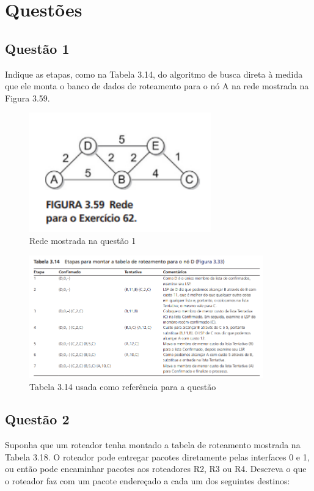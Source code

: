\section{Questões}\label{sec:questoes}


\subsection{Questão 1}
Indique as etapas, como na Tabela 3.14, do algoritmo de busca direta à medida que ele monta o
banco de dados de roteamento para o nó A na rede mostrada na Figura 3.59.

\begin{figure}[H]
    \centering
    \includegraphics[width=0.7\textwidth]{images/ex_62.png}
    \caption{Rede mostrada na questão 1}
    \label{fig:questao_1}
\end{figure}

\begin{figure}[H]
    \centering
    \includegraphics[width=0.9\textwidth]{images/tabela_3_14.png}
    \caption{Tabela 3.14 usada como referência para a questão} 
    \label{fig:questao_1_tabela}
\end{figure}

\subsection{Questão 2}
Suponha que um roteador tenha montado a tabela de roteamento mostrada na Tabela 3.18. O
roteador pode entregar pacotes diretamente pelas interfaces 0 e 1, ou então pode encaminhar
pacotes aos roteadores R2, R3 ou R4. Descreva o que o roteador faz com um pacote endereçado a
cada um dos seguintes destinos:

